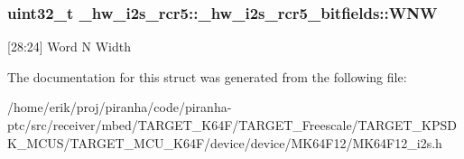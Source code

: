 \subsubsection[{\texorpdfstring{W\+NW}{WNW}}]{\setlength{\rightskip}{0pt plus 5cm}uint32\+\_\+t \+\_\+hw\+\_\+i2s\+\_\+rcr5\+::\+\_\+hw\+\_\+i2s\+\_\+rcr5\+\_\+bitfields\+::\+W\+NW}\hypertarget{struct__hw__i2s__rcr5_1_1__hw__i2s__rcr5__bitfields_a331661a0e269b929688707be712da072}{}\label{struct__hw__i2s__rcr5_1_1__hw__i2s__rcr5__bitfields_a331661a0e269b929688707be712da072}
\mbox{[}28\+:24\mbox{]} Word N Width 

The documentation for this struct was generated from the following file\+:\begin{DoxyCompactItemize}
\item 
/home/erik/proj/piranha/code/piranha-\/ptc/src/receiver/mbed/\+T\+A\+R\+G\+E\+T\+\_\+\+K64\+F/\+T\+A\+R\+G\+E\+T\+\_\+\+Freescale/\+T\+A\+R\+G\+E\+T\+\_\+\+K\+P\+S\+D\+K\+\_\+\+M\+C\+U\+S/\+T\+A\+R\+G\+E\+T\+\_\+\+M\+C\+U\+\_\+\+K64\+F/device/device/\+M\+K64\+F12/M\+K64\+F12\+\_\+i2s.\+h\end{DoxyCompactItemize}
